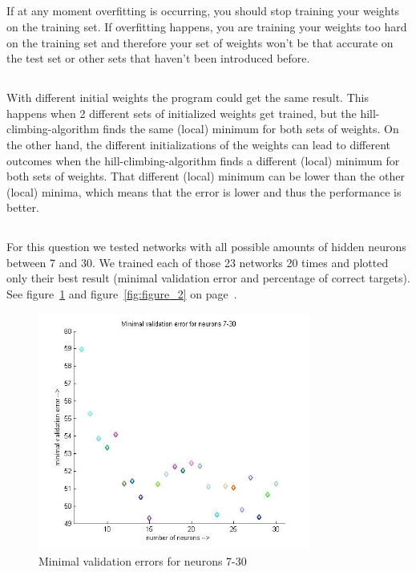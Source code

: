 \documentclass{scrartcl}
\begin{document}
  \subsection{}
 If at any moment overfitting is occurring, you should stop training your weights on the training set. If overfitting happens, you are training your weights too hard on the training set and therefore your set of weights won't be that accurate on the test set or other sets that haven't been introduced before.
  
  \subsection{}
  With different initial weights the program could get the same result. This happens when 2 different sets of initialized weights get trained, but the hill-climbing-algorithm finds the same (local) minimum for both sets of weights. On the other hand, the different initializations of the weights
 can lead to different outcomes when the hill-climbing-algorithm finds a different (local) minimum for both sets of weights. That different (local) minimum can be lower than the other (local) minima, which means that the error is lower and thus the performance is better.
 
 \subsection{}
 For this question we tested networks with all possible amounts of hidden neurons between 7 and 30. We trained each of those 23 networks 20 times and plotted only their best result (minimal validation error and percentage of correct targets).
 See figure~\ref{fig:figure_1} and figure~\ref{fig:figure_2} on page~\pageref{fig:figure_2}.

 \begin{figure}[p]
    \centering
    \includegraphics[width=0.8\textwidth]{Plot_Validation_Error.jpg}
    \caption{Minimal validation errors for neurons 7-30}
    \label{fig:figure_1}
\end{figure}
\end{document}
